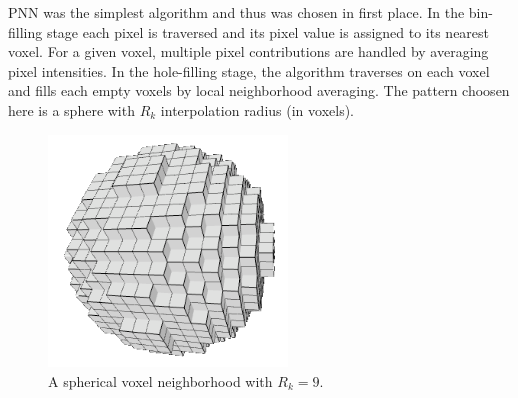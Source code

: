 \documentclass[12pt,journal,compsoc]{IEEEtran}
\begin{document}
PNN was the simplest algorithm and thus was chosen in first place. 
In the bin-filling stage each pixel is traversed and its pixel value is assigned to its nearest voxel. 
For a given voxel, multiple pixel contributions are handled by averaging pixel intensities.  
In the hole-filling stage, the algorithm traverses on each voxel and fills each empty voxels by local neighborhood averaging. The pattern choosen here is a sphere with $R_k$ interpolation radius (in voxels). 

\begin{figure}[h!]
\centering
\includegraphics[width=2.5in]{neighborhood}
\caption{A spherical voxel neighborhood with $R_k=9$.}
\label{neighborhood}
\end{figure}
\end{document}
